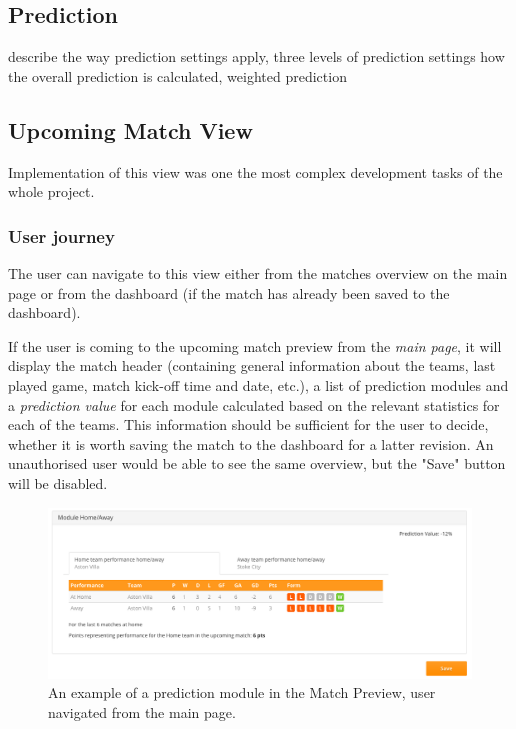 \subsection{Prediction}

describe the way prediction settings apply, three levels of prediction settings
how the overall prediction is calculated, weighted prediction

\subsection{Upcoming Match View}
\label{subsec:implementupcomingmatchview}

Implementation of this view was one the most complex development tasks of the whole project. \par

\subsubsection{User journey}
\label{subsec:upcomingmatchviewuserjourney}

The user can navigate to this view either from the matches overview on the main page or from the dashboard (if the match has already been saved to the dashboard).\par

 If the user is coming to the upcoming match preview from the \emph{main page}, it will display the match header (containing general information about the teams, last played game, match kick-off time and date, etc.), a list of prediction modules and a \emph{prediction value} for each module calculated based on the relevant statistics for each of the teams. This information should be sufficient for the user to decide, whether it is worth saving the match to the dashboard for a latter revision. An unauthorised user would be able to see the same overview, but the "Save" button will be disabled. 

\begin{figure}[H]
\begin{center}
\includegraphics[width=.90\linewidth,natwidth=610,natheight=642]{impl/images/matchoverviewex_from_main_page}
\caption{An example of a prediction module in the Match Preview, user navigated from the main page.} \label{fig:using: matchoverviewex_from_main_page}
\end{center}
\end{figure}

